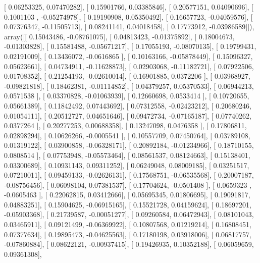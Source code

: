 \documentclass{article}
\begin{document}
       [ 0.06253325,  0.07470282],
       [ 0.15901766,  0.03385846],
       [ 0.20577151,  0.04090696],
       [ 0.1001103 , -0.05274978],
       [ 0.19190908,  0.05350492],
       [ 0.16657723, -0.04059576],
       [ 0.07376347, -0.11505713],
       [ 0.08241141,  0.04018458],
       [ 0.17773912, -0.03986589]]), array([[ 0.15043486, -0.08761075],
       [ 0.04813423, -0.01375892],
       [ 0.18004673, -0.01303828],
       [ 0.15581488, -0.05671217],
       [ 0.17055193, -0.08070135],
       [ 0.19799431,  0.02191009],
       [ 0.13436072, -0.0616865 ],
       [ 0.10163166, -0.05878449],
       [ 0.15096327,  0.05623661],
       [ 0.04734911, -0.11628873],
       [ 0.02903068, -0.11182721],
       [ 0.07922506,  0.01708352],
       [ 0.21254193, -0.02610014],
       [ 0.16901885,  0.0372206 ],
       [ 0.03968927, -0.09821818],
       [ 0.18462381, -0.01114852],
       [ 0.04379257,  0.05370533],
       [ 0.06944213,  0.0571538 ],
       [ 0.03370828, -0.01063939],
       [ 0.12660698,  0.0533414 ],
       [ 0.10720655,  0.05661389],
       [ 0.11842492,  0.07443692],
       [ 0.07312558, -0.02423212],
       [ 0.20680246,  0.01054111],
       [ 0.20512727,  0.04651646],
       [ 0.09472734, -0.07165187],
       [ 0.07740262,  0.0377264 ],
       [ 0.20277253,  0.00688358],
       [ 0.13247098,  0.0476358 ],
       [ 0.17806811,  0.02898294],
       [ 0.10626266, -0.0005541 ],
       [ 0.10557709,  0.07450764],
       [ 0.03789108,  0.01319122],
       [ 0.03900858, -0.06328171],
       [ 0.20892184, -0.01234966],
       [ 0.18710155,  0.0808514 ],
       [ 0.07753948, -0.05573464],
       [ 0.08561537,  0.08124663],
       [ 0.15138401,  0.03300689],
       [ 0.10931143,  0.09311252],
       [ 0.06249048,  0.08009185],
       [ 0.03251517,  0.07210011],
       [ 0.09459133, -0.02626131],
       [ 0.17568751, -0.06535568],
       [ 0.20007187, -0.08756456],
       [ 0.06098104,  0.07381537],
       [ 0.17704624, -0.0501408 ],
       [ 0.0659323 , -0.0605463 ],
       [ 0.22062815,  0.03412666],
       [ 0.05695345,  0.01806695],
       [ 0.19091817,  0.04883251],
       [ 0.15904625, -0.06915165],
       [ 0.15521728,  0.04159624],
       [ 0.18697201, -0.05903368],
       [ 0.21739587, -0.00051277],
       [ 0.09260584,  0.06472943],
       [ 0.08101043,  0.03465911],
       [ 0.09121499, -0.06369922],
       [ 0.10807568,  0.01219214],
       [ 0.16808451,  0.07377634],
       [ 0.19895473, -0.04625563],
       [ 0.17180198,  0.03918006],
       [ 0.06817757, -0.07860884],
       [ 0.08622121, -0.00937415],
       [ 0.19426935,  0.10352188],
       [ 0.06059659,  0.09361308],
\end{document}
